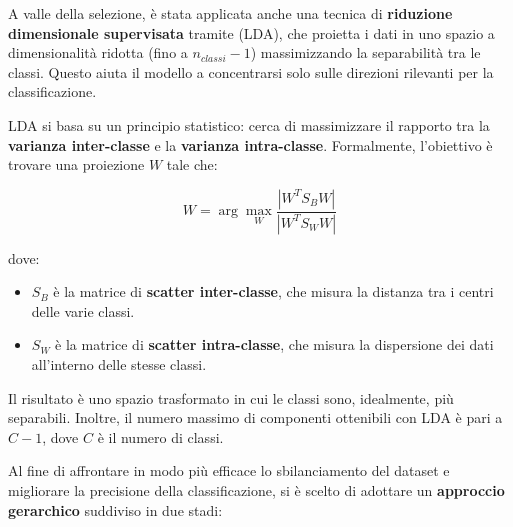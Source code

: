 \documentclass[minted, draw]{../tex/hebdomon}
\begin{document}
A valle della selezione, è stata applicata anche una tecnica di \textbf{riduzione dimensionale supervisata} tramite  (LDA), che proietta i dati in uno spazio a dimensionalità ridotta (fino a $n_{classi} - 1$) massimizzando la separabilità tra le classi. Questo aiuta il modello a concentrarsi solo sulle direzioni rilevanti per la classificazione.

LDA si basa su un principio statistico: cerca di massimizzare il rapporto tra la \textbf{varianza inter-classe} e la \textbf{varianza intra-classe}. Formalmente, l'obiettivo è trovare una proiezione $W$ tale che:

\[
W = \arg\max_W \frac{|W^T S_B W|}{|W^T S_W W|}
\]

dove:
\begin{itemize}
\item $S_B$ è la matrice di \textbf{scatter inter-classe}, che misura la distanza tra i centri delle varie classi.
\item $S_W$ è la matrice di \textbf{scatter intra-classe}, che misura la dispersione dei dati all'interno delle stesse classi.
\end{itemize}

Il risultato è uno spazio trasformato in cui le classi sono, idealmente, più separabili. Inoltre, il numero massimo di componenti ottenibili con LDA è pari a $C - 1$, dove $C$ è il numero di classi.





Al fine di affrontare in modo più efficace lo sbilanciamento del dataset e migliorare la precisione della classificazione, si è scelto di adottare un \textbf{approccio gerarchico} suddiviso in due stadi:
\end{document}
